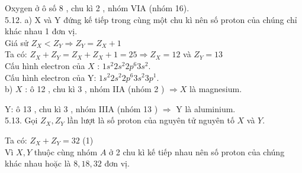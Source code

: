 \documentclass[10pt]{article}
\begin{document}
Oxygen ở ô số 8 , chu kì 2 , nhóm VIA (nhóm 16).\\
5.12. a) X và Y đứng kế tiếp trong cùng một chu kì nên số proton của chúng chỉ khác nhau 1 đơn vị.\\
Giá sử $Z_{X}<Z_{Y} \Rightarrow Z_{Y}=Z_{X}+1$\\
Ta có: $Z_{X}+Z_{Y}=Z_{X}+Z_{X}+1=25 \Rightarrow Z_{X}=12$ và $Z_{Y}=13$\\
Cấu hình electron của $X$ : $1 s^{2} 2 s^{2} 2 p^{6} 3 s^{2}$.\\
Cấu hình electron của Y: $1 s^{2} 2 s^{2} 2 p^{6} 3 s^{2} 3 p^{1}$.\\
b) $X$ : ô 12 , chu kì 3 , nhóm IIA (nhóm 2 ) $\Rightarrow X$ là magnesium.

Y: ô 13 , chu kì 3 , nhóm IIIA (nhóm 13 ) $\Rightarrow$ Y là aluminium.\\
5.13. Gọi $Z_{X}, Z_{Y}$ lần lượt là số proton của nguyên tử nguyên tố $X$ và $Y$.

Ta có: $Z_{X}+Z_{Y}=32$ (1)\\
Vì $X, Y$ thuộc cùng nhóm $A$ ở 2 chu kì kế tiếp nhau nên số proton của chúng khác nhau hoặc là $8,18,32$ đơn vị.
\end{document}
